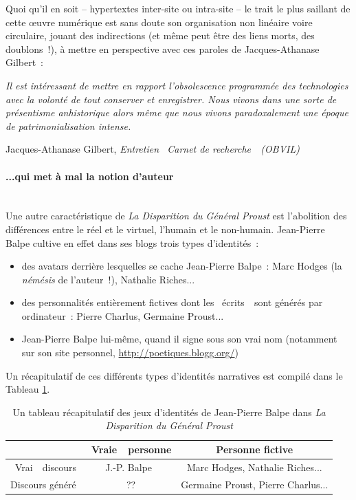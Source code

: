 \documentclass{article}
\newcommand{\subsubsubsection}[1]{\paragraph{#1}\mbox{}\\}
\newenvironment{citationbox}
{\begin{center}
		\begin{minipage}{.8\textwidth}
		}
		{
		\end{minipage}	
\end{center}
}
\begin{document}
					Quoi qu'il en soit -- hypertextes inter-site ou intra-site -- le trait le plus saillant de cette œuvre numérique est sans doute son organisation non linéaire voire circulaire, jouant des indirections (et même peut être des liens morts, des doublons~!), à mettre en perspective avec ces paroles de Jacques-Athanase Gilbert~:
					\begin{citationbox}
						\textit{Il est intéressant de mettre en rapport l’obsolescence programmée des technologies avec la volonté de tout conserver et enregistrer. Nous vivons dans une sorte de présentisme anhistorique alors même que nous vivons paradoxalement une époque de patrimonialisation intense.}
						\begin{flushright}
							Jacques-Athanase Gilbert, \textit{Entretien \guillemotleft~Carnet de recherche~\guillemotright~(OBVIL)} \autocite{gilbert2018}
						\end{flushright}
					\end{citationbox}
				\subsubsubsection{...qui met à mal la notion d'auteur}
					Une autre caractéristique de \textit{La Disparition du Général Proust} est l'abolition des différences entre le réel et le virtuel, l'humain et le non-humain. Jean-Pierre Balpe cultive en effet dans ses blogs trois types d'identités~:
					\vspace{2mm}
					\begin{itemize}
						\item des avatars derrière lesquelles se cache Jean-Pierre Balpe : Marc Hodges (la \textit{némésis} de l'auteur~!), Nathalie Riches...
						\item des personnalités entièrement fictives dont les \guillemotleft~écrits~\guillemotright~sont générés par ordinateur : Pierre Charlus, Germaine Proust...
						\item Jean-Pierre Balpe lui-même, quand il signe sous son vrai nom (notamment sur son site personnel, \href{http://poetiques.blogg.org/}{http://poetiques.blogg.org/})
					\end{itemize}
					\vspace{2mm}
					Un récapitulatif de ces différents types d'identités narratives est compilé dans le Tableau \ref{tab:balpe_identites}.
					\begin{table}
						\centering
						\begin{tabular}{c | c c}
							&\guillemotleft~Vraie~\guillemotright~personne & Personne fictive \\ \hline
							\guillemotleft~Vrai~\guillemotright~discours & J.-P. Balpe & Marc Hodges, Nathalie Riches...\\
							Discours généré &~?? & Germaine Proust, Pierre Charlus...
						\end{tabular}
						\caption{Un tableau récapitulatif des jeux d'identités de Jean-Pierre Balpe dans \textit{La Disparition du Général Proust}}
						\label{tab:balpe_identites}
					\end{table}
\end{document}
